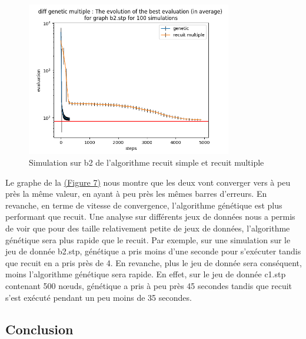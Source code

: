 \documentclass[11pt,french]{report}
\begin{document}
        \begin{figure}
        	\begin{center}
        		\includegraphics[width=0.8\textwidth]{best_b2_evaluation_diff genetic multiple.png}
        	\end{center}
        	\caption{Simulation sur b2 de l'algorithme recuit simple et recuit multiple}
        	\label{Figure7}
        \end{figure}

        Le graphe de la \hyperref[Figure7]{(Figure 7)} nous montre que les deux vont converger vers à peu près la même valeur, en ayant à peu près les mêmes barres d'erreurs. En revanche, en terme de vitesse de convergence, l'algorithme génétique est plus performant que recuit.
        Une analyse sur différents jeux de données nous a permis de voir que pour des taille relativement petite de jeux de données, l'algorithme génétique sera plus rapide que le recuit. Par exemple, sur une simulation sur le jeu de donnée b2.stp, génétique a pris moins d'une seconde pour s'exécuter tandis que recuit en a pris près de 4.
        En revanche, plus le jeu de donnée sera conséquent, moins l'algorithme génétique sera rapide. En effet, sur le jeu de donnée c1.stp contenant 500 nœuds, génétique a pris à peu près 45 secondes tandis que recuit s'est exécuté pendant un peu moins de 35 secondes.

		\break
        \subsection{Conclusion}
\end{document}
